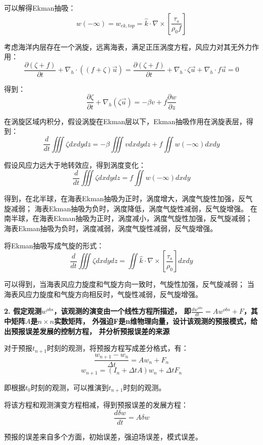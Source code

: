 \documentclass{article}
\begin{document}
可以解得Ekman抽吸：
$$w(-\infty)={{w}_{ek,top}}=\hat{k}\cdot \nabla \times \left[ \frac{{{\tau }_{s}}}{{{\rho }_{0}}f} \right]$$

考虑海洋内层存在一个涡旋，远离海表，满足正压涡度方程，风应力对其无外力作用：
$$\frac{\partial(\zeta+f)}{\partial t} + \nabla_h\cdot((f+\zeta)\vec{u})
 = \frac{\partial(\zeta+f)}{\partial t} + \nabla_h\cdot\zeta\vec{u}
 + \nabla_h\cdot f\vec{u}=0$$

得到：
$$\frac{\partial\zeta}{\partial t} + \nabla_h(\zeta\vec{u})
=-\beta v +f\frac{\partial w}{\partial z}$$

在涡旋区域内积分，假设涡旋在Ekman层以下，Ekman抽吸作用在涡旋表层，得到：
$$\frac{d}{dt}\iiint\zeta dxdydz
=-\beta\iiint v dxdydz + f\iint w(-\infty) dxdy$$

假设风应力远大于地转效应，得到涡度变化：
$$\frac{d}{dt}\iiint\zeta dxdydz
= f\iint  w(-\infty) dxdy$$

得到，在北半球，在海表Ekman抽吸为正时，涡度增大，涡度气旋性加强，反气旋减弱；
海表Ekman抽吸为负时，涡度降低，涡度气旋性减弱，反气旋增强。
在南半球，在海表Ekman抽吸为正时，涡度减小，涡度气旋性加强，反气旋减弱；
海表Ekman抽吸为负时，涡度减弱，涡度气旋性减弱，反气旋增强。

将Ekman抽吸写成气旋的形式：
$$\frac{d}{dt}\iiint\zeta dxdydz
=\iint\hat{k}\cdot \nabla \times \left[ \frac{{{\tau }_{s}}}{{{\rho }_{0}}} \right]dxdy$$

可以得到，当海表风应力旋度和气旋方向一致时，气旋性加强，反气旋减弱；
当海表风应力旋度和气旋方向相反时，气旋性减弱，反气旋增强。

\textbf{2. 假定观测$w^{obs}$，该观测的演变由一个线性方程所描述，
即$\frac{dw^{obs}}{dt} = Aw^{obs} + F$，其中矩阵$A$是$n\times n$实数矩阵，
外强迫F是n维物理向量，设计该观测的预报模式，给出预报误差发展的控制方程，
并分析预报误差的来源}

对于预报$t_{n+1}$时刻的观测，将预报方程写成差分格式，有：
$$\frac{w_{n+1} - w_{n}}{\Delta t} = Aw_{n} + F_n$$
$$w_{n+1} = (I_n+\Delta tA)w_{n} + \Delta tF_n$$

即根据$t_0$时刻的观测，可以推演到$t_{n+1}$时刻的观测。

将该方程和观测演变方程相减，得到预报误差的发展方程：
$$\frac{d\delta w}{dt} = A\delta w$$

预报的误差来自多个方面，初始误差，强迫场误差，模式误差。
\end{document}
